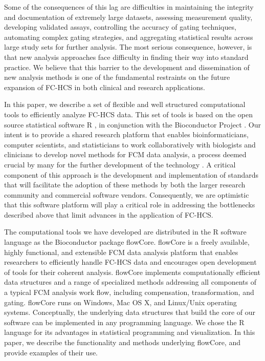 \documentclass[12pt]{article}
\newcommand{\Rpackage}[1]{{\textsf{#1}}}
\begin{document}
Some of the consequences of this lag are difficulties in maintaining
the integrity and documentation of extremely large datasets, assessing
measurement quality, developing validated assays, controlling the
accuracy of gating techniques, automating complex gating strategies,
and aggregating statistical results across large study sets for
further analysis. The most serious consequence, however, is that new
analysis approaches face difficulty in finding their way into standard
practice. We believe that this barrier to the development and
dissemination of new analysis methods is one of the fundamental
restraints on the future expansion of FC-HCS in both clinical and
research applications.

In this paper, we describe a set of flexible and well structured
computational tools to efficiently analyze FC-HCS data. This set of
tools is based on the open source statistical software R
\citep{Rmain}, in conjunction with the Bioconductor Project
\citep{BIOC}. Our intent is to provide a shared research platform that
enables bioinformaticians, computer scientists, and statisticians to
work collaboratively with biologists and clinicians to develop novel
methods for FCM data analysis, a process deemed crucial by many for
the further development of the technology \citep{lizard2007fca}. A
critical component of this approach is the development and
implementation of standards that will facilitate the adoption of these
methods by both the larger research community and commercial software
vendors.  Consequently, we are optimistic that this software platform
will play a critical role in addressing the bottlenecks described
above that limit advances in the application of FC-HCS.

The computational tools we have developed are distributed in the R
software language as the Bioconductor package
\Rpackage{flowCore}. \Rpackage{flowCore} is a freely available, highly
functional, and extensible FCM data analysis platform that enables
researchers to efficiently handle FC-HCS data and encourages open
development of tools for their coherent analysis. \Rpackage{flowCore}
implements computationally efficient data structures and a range of
specialized methods addressing all components of a typical FCM
analysis work flow, including compensation, transformation, and
gating. \Rpackage{flowCore} runs on Windows, Mac OS X, and Linux/Unix
operating systems. Conceptually, the underlying data structures that
build the core of our software can be implemented in any programming
language. We chose the R language for its advantages in statistical
programming and visualization. In this paper, we describe the
functionality and methods underlying \Rpackage{flowCore}, and provide
examples of their use.
\end{document}
